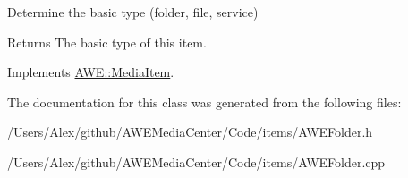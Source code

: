 Determine the basic type (folder, file, service) 

\begin{DoxyReturn}{Returns}
The basic type of this item. 
\end{DoxyReturn}


Implements \hyperlink{class_a_w_e_1_1_media_item_ad7a7ef28069986fad8b2be060fef6e48}{A\-W\-E\-::\-Media\-Item}.



The documentation for this class was generated from the following files\-:\begin{DoxyCompactItemize}
\item 
/\-Users/\-Alex/github/\-A\-W\-E\-Media\-Center/\-Code/items/A\-W\-E\-Folder.\-h\item 
/\-Users/\-Alex/github/\-A\-W\-E\-Media\-Center/\-Code/items/A\-W\-E\-Folder.\-cpp\end{DoxyCompactItemize}
